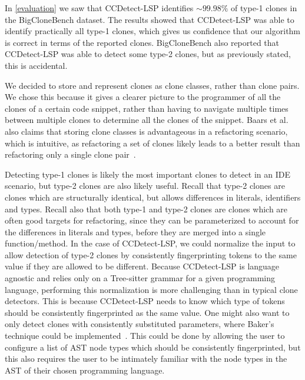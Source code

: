 In \cref{evaluation} we saw that CCDetect-LSP identifies ${\sim}99.98\%$ of type-1 clones in
the BigCloneBench dataset. The results showed that CCDetect-LSP was able to identify
practically all type-1 clones, which gives us confidence that our algorithm is correct in
terms of the reported clones. BigCloneBench also reported that CCDetect-LSP was able to
detect some type-2 clones, but as previously stated, this is accidental.

We decided to store and represent clones as clone classes, rather than clone pairs. We
chose this because it gives a clearer picture to the programmer of all the clones of a
certain code snippet, rather than having to navigate multiple times between multiple
clones to determine all the clones of the snippet. Baars et al. also claims that storing
clone classes is advantageous in a refactoring scenario, which is intuitive, as
refactoring a set of clones likely leads to a better result than refactoring only a single
clone pair~\cite{TowardsAutomatedRefactoring}.

Detecting type-1 clones is likely the most important clones to detect in an IDE scenario,
but type-2 clones are also likely useful. Recall that type-2 clones are clones which are
structurally identical, but allows differences in literals, identifiers and types. Recall
also that both type-1 and type-2 clones are clones which are often good targets for
refactoring, since they can be parameterized to account for the differences in literals
and types, before they are merged into a single function/method. In the case of
CCDetect-LSP, we could normalize the input to allow detection of type-2 clones by
consistently fingerprinting tokens to the same value if they are allowed to be different.
Because CCDetect-LSP is language agnostic and relies only on a Tree-sitter grammar for a
given programming language, performing this normalization is more challenging than in
typical clone detectors. This is because CCDetect-LSP needs to know which type of tokens
should be consistently fingerprinted as the same value. One might also want to only detect
clones with consistently substituted parameters, where Baker's technique could be
implemented~\cite{Bakerdup}. This could be done by allowing the user to configure a list
of AST node types which should be consistently fingerprinted, but this also requires the
user to be intimately familiar with the node types in the AST of their chosen programming
language.

